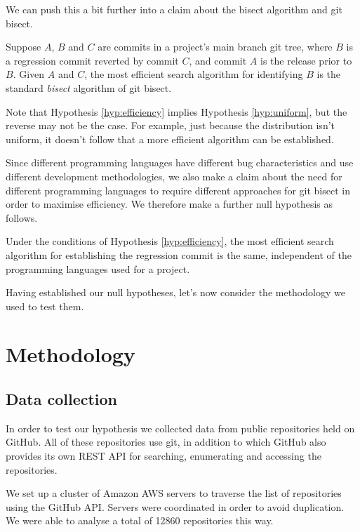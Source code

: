 \documentclass[10pt,journal,compsoc]{IEEEtran}
\begin{document}
We can push this a bit further into a claim about the bisect algorithm and {\code git bisect}.

\begin{hypothesis}
\label{hyp:efficiency}
Suppose $A$, $B$ and $C$ are commits in a project's main branch git tree, where $B$ is a regression commit reverted by commit $C$, and commit $A$ is the release prior to $B$. Given $A$ and $C$, the most efficient search algorithm for identifying $B$ is the standard {\it bisect\/} algorithm of {\code git bisect}.
\end{hypothesis}

Note that Hypothesis \ref{hyp:efficiency} implies Hypothesis \ref{hyp:uniform}, but the reverse may not be the case. For example, just because the distribution isn't uniform, it doesn't follow that a more efficient algorithm can be established.

Since different programming languages have different bug characteristics \cite{nanz2015} and use different development methodologies, we also make a claim about the need for different programming languages to require different approaches for {\code git bisect} in order to maximise efficiency. We therefore make a further null hypothesis as follows.

\begin{hypothesis}
\label{hyp:algorithm}
Under the conditions of Hypothesis \ref{hyp:efficiency}, the most efficient search algorithm for establishing the regression commit is the same, independent of the programming languages used for a project.
\end{hypothesis}

Having established our null hypotheses, let's now consider the methodology we used to test them.

\section{Methodology}

\subsection{Data collection}

In order to test our hypothesis we collected data from public repositories held on GitHub. All of these repositories use {\code git}, in addition to which GitHub also provides its own REST API for searching, enumerating and accessing the repositories.

We set up a cluster of Amazon AWS servers to traverse the list of repositories using the GitHub API. Servers were coordinated in order to avoid duplication. We were able to analyse a total of 12860 repositories this way.
\end{document}
